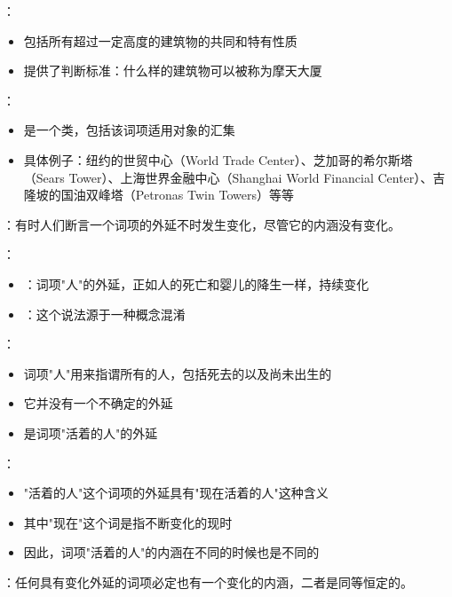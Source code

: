 \begin{examplebox}[title="摩天大厦"的内涵与外延分析]
：
\begin{itemize}
  \item 包括所有超过一定高度的建筑物的共同和特有性质
  \item 提供了判断标准：什么样的建筑物可以被称为摩天大厦
\end{itemize}

：
\begin{itemize}
  \item 是一个类，包括该词项适用对象的汇集
  \item 具体例子：纽约的世贸中心（World Trade Center）、芝加哥的希尔斯塔（Sears Tower）、上海世界金融中心（Shanghai World Financial Center）、吉隆坡的国油双峰塔（Petronas Twin Towers）等等
\end{itemize}
\end{examplebox}

\begin{theorembox}[title=外延变化的误解与澄清]
：有时人们断言一个词项的外延不时发生变化，尽管它的内涵没有变化。

：
\begin{itemize}
  \item {}：词项"人"的外延，正如人的死亡和婴儿的降生一样，持续变化
  \item {}：这个说法源于一种概念混淆
\end{itemize}

：
\begin{itemize}
  \item 词项"人"用来指谓所有的人，包括死去的以及尚未出生的
  \item 它并没有一个不确定的外延
  \item {}是词项"活着的人"的外延
\end{itemize}

：
\begin{itemize}
  \item "活着的人"这个词项的外延具有"现在活着的人"这种含义
  \item 其中"现在"这个词是指不断变化的现时
  \item 因此，词项"活着的人"的内涵在不同的时候也是不同的
\end{itemize}

：任何具有变化外延的词项必定也有一个变化的内涵，二者是同等恒定的。
\end{theorembox}

